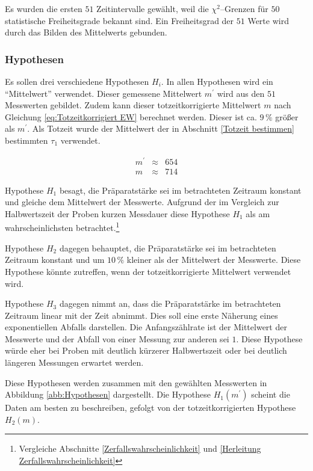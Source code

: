 \documentclass[12pt,a4paper]{scrartcl}
\numberwithin{equation}{section} %
\begin{document}
Es wurden die ersten \(51\) Zeitintervalle gewählt, weil die $\chi^2$--Grenzen für $50$ statistische Freiheitsgrade bekannt sind. \cite{Kapur} Ein Freiheitsgrad der $51$ Werte wird durch das Bilden des Mittelwerts gebunden.

\subsubsection{Hypothesen}
\label{Hypothesen}
Es sollen drei verschiedene Hypothesen $H_i$. In allen Hypothesen wird ein ``Mittelwert'' verwendet. Dieser gemessene Mittelwert $m^\prime$ wird aus den $51$ Messwerten gebildet. Zudem kann dieser totzeitkorrigierte Mittelwert $m$ nach Gleichung \ref{eq:Totzeitkorrigiert EW} berechnet werden. Dieser ist ca. $9\,\%$ größer als $m^\prime$. Als Totzeit wurde der Mittelwert der in Abschnitt \ref{Totzeit bestimmen} bestimmten $\tau_1$ verwendet.

\begin{eqnarray}
	m^\prime &\approx& 654 \\
	m &\approx& 714
\end{eqnarray}

Hypothese $H_1$ besagt, die Präparatstärke sei im betrachteten Zeitraum konstant und gleiche dem Mittelwert der Messwerte. Aufgrund der im Vergleich zur Halbwertszeit der Proben kurzen Messdauer diese Hypothese $H_1$ als am wahrscheinlichsten betrachtet.\footnote{Vergleiche Abschnitte \ref{Zerfallswahrscheinlichkeit} und \ref{Herleitung Zerfallswahrscheinlichkeit}}

Hypothese $H_2$ dagegen behauptet, die Präparatstärke sei im betrachteten Zeitraum konstant und um $10\,\%$ kleiner als der Mittelwert der Messwerte. Diese Hypothese könnte zutreffen, wenn der totzeitkorrigierte Mittelwert verwendet wird.

Hypothese $H_3$ dagegen nimmt an, dass die Präparatstärke im betrachteten Zeitraum linear mit der Zeit abnimmt. Dies soll eine erste Näherung eines exponentiellen Abfalls darstellen. Die Anfangszählrate ist der Mittelwert der Messwerte und der Abfall von einer Messung zur anderen sei $1$. Diese Hypothese würde eher bei Proben mit deutlich kürzerer Halbwertszeit oder bei deutlich längeren Messungen erwartet werden.

Diese Hypothesen werden zusammen mit den gewählten Messwerten in Abbildung \ref{abb:Hypothesen} dargestellt. Die Hypothese $H_1(m^\prime)$ scheint die Daten am besten zu beschreiben, gefolgt von der totzeitkorrigierten Hypothese $H_2(m)$.
\end{document}
